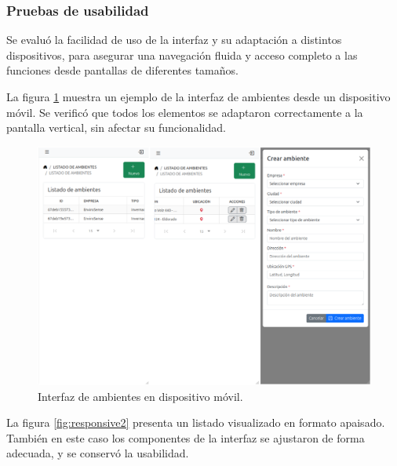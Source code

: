 \subsubsection{Pruebas de usabilidad}

Se evaluó la facilidad de uso de la interfaz y su adaptación a distintos
dispositivos, para asegurar una navegación fluida y acceso completo a las
funciones desde pantallas de diferentes tamaños.

La figura \ref{fig:responsive1} muestra un ejemplo de la interfaz de ambientes
desde un dispositivo móvil. Se verificó que todos los elementos se adaptaron
correctamente a la pantalla vertical, sin afectar su funcionalidad.

\begin{figure}[H]
    \centering
    \includegraphics[width=\textwidth]{Images/49_responsive.png}
    \caption[Interfaz de ambientes en dispositivo móvil]{Interfaz de ambientes en dispositivo móvil.}
    \label{fig:responsive1}
\end{figure}

La figura \ref{fig:responsive2} presenta un listado visualizado en formato
apaisado. También en este caso los componentes de la interfaz se ajustaron de
forma adecuada, y se conservó la usabilidad.

